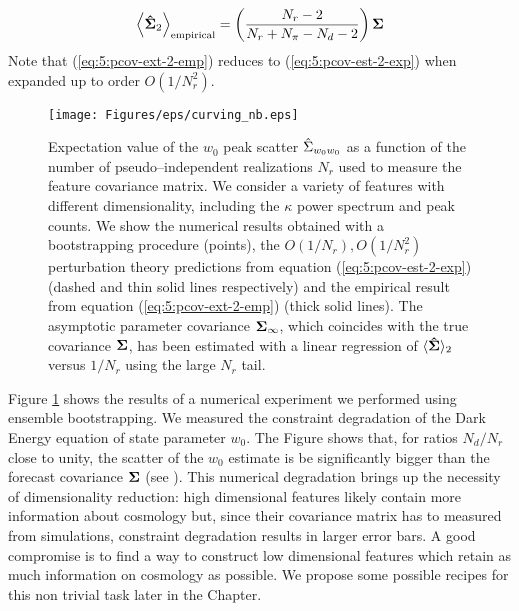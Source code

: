 \begin{equation}
\label{eq:5:pcov-ext-2-emp}
\left\langle\mathbf{\hat{\Sigma}}_2\right\rangle_{\rm empirical} = \left(\frac{N_r-2}{N_r+N_\pi-N_d-2}\right)\mathbf{\Sigma}
\end{equation}
%
Note that (\ref{eq:5:pcov-ext-2-emp}) reduces to (\ref{eq:5:pcov-est-2-exp}) when expanded up to order $O(1/N_r^2)$. 
%
\begin{figure}
\begin{center}
\texttt{[image: Figures/eps/curving\_nb.eps]}
\end{center}
\caption{Expectation value of the $w_0$ peak scatter $\hat{\Sigma}_{w_0w_0}$ as a function of the number of pseudo--independent realizations $N_r$ used to measure the feature covariance matrix. We consider a variety of features with different dimensionality, including the $\kappa$ power spectrum and peak counts. We show the numerical results obtained with a bootstrapping procedure (points), the $O(1/N_r),O(1/N_r^2)$ perturbation theory predictions from equation (\ref{eq:5:pcov-est-2-exp}) (dashed and thin solid lines respectively) and the empirical result from equation (\ref{eq:5:pcov-ext-2-emp}) (thick solid lines). The asymptotic parameter covariance $\mathbf{\Sigma}_\infty$, which coincides with the true covariance $\mathbf{\Sigma}$, has been estimated with a linear regression of $\langle\mathbf{\hat{\Sigma}}\rangle_2$ versus $1/N_r$ using the large $N_r$ tail.} 
\label{fig:5:curvenb}
\end{figure}
%
Figure \ref{fig:5:curvenb} shows the results of a numerical experiment we performed using ensemble bootstrapping. We measured the constraint degradation of the Dark Energy equation of state parameter $w_0$. The Figure shows that, for ratios $N_d/N_r$ close to unity, the scatter of the $w_0$ estimate is be significantly bigger than the forecast covariance $\mathbf{\Sigma}$ (see \citep{DodelsonSchneider13,PetriVariance}). This numerical degradation brings up the necessity of dimensionality reduction: high dimensional features likely contain more information about cosmology but, since their covariance matrix has to measured from simulations, constraint degradation results in larger error bars. A good compromise is to find a way to construct low dimensional features which retain as much information on cosmology as possible. We propose some possible recipes for this non trivial task later in the Chapter.  

